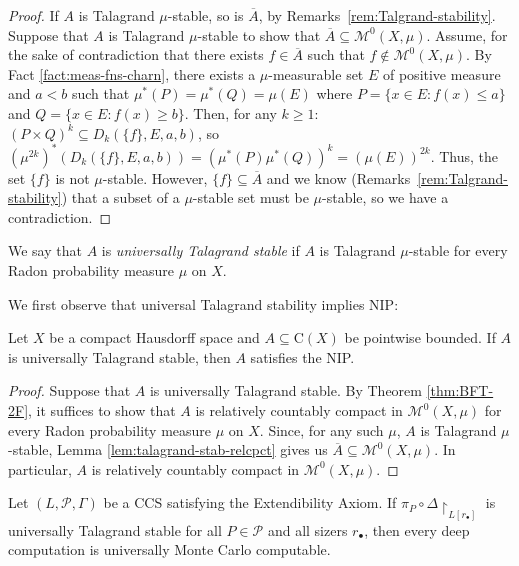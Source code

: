 \begin{proof}
    If $A$ is Talagrand $\mu$-stable, so is $\overline{A}$, by Remarks~\ref{rem:Talgrand-stability}.
    Suppose that $A$ is Talagrand $\mu$-stable to show that $\overline{A}\subseteq \mathscr{M}^0(X,\mu)$.
    Assume, for the sake of contradiction that there exists $f\in\overline{A}$ such that $f\notin \mathscr{M}^0(X,\mu)$.
    By Fact \ref{fact:meas-fns-charn}, there exists a $\mu$-measurable set $E$ of positive measure and $a<b$ such that $\mu^*(P)=\mu^*(Q)=\mu(E)$ where $P=\{x\in E: f(x)\leq a\}$ and $Q=\{x\in E: f(x)\geq b\}$.
    Then, for any $k\geq 1$: $(P\times Q)^k\subseteq D_k(\{f\},E,a,b)$, so $(\mu^{2k})^*(D_k(\{f\},E,a,b))=(\mu^*(P)\mu^*(Q))^k=(\mu(E))^{2k}$.
    Thus, the set $\{f\}$ is not $\mu$-stable. 
    However, $\{f\}\subseteq\overline{A}$ and we know (Remarks~\ref{rem:Talgrand-stability}) that a subset of a $\mu$-stable set must be $\mu$-stable,
    so we have a contradiction.
\end{proof}

\begin{definition}
We say that $A$ is \emph{universally Talagrand stable} if $A$ is Talagrand $\mu$-stable for every Radon probability measure $\mu$ on $X$.
\end{definition}

We first observe that universal Talagrand stability implies NIP:

\begin{proposition}\label{prop:Talagrand-implies-NIP}
    Let $X$ be a compact Hausdorff space and $A\subseteq \mathrm{C}(X)$ be pointwise bounded.
    If $A$ is universally Talagrand stable, then $A$ satisfies the NIP.
\end{proposition}

\begin{proof}
    Suppose that $A$ is universally Talagrand stable.
    By Theorem \ref{thm:BFT-2F}, it suffices to show that $A$ is relatively countably compact in $\mathscr{M}^0(X,\mu)$ for every Radon probability measure $\mu$ on $X$.
    Since, for any such $\mu$, $A$ is Talagrand $\mu$-stable, Lemma \ref{lem:talagrand-stab-relcpct} gives us $\overline{A}\subseteq\mathscr{M}^0(X,\mu)$.
    In particular, $A$ is relatively countably compact in $\mathscr{M}^0(X,\mu)$.
\end{proof}

\begin{corollary}
\label{cor:Talagrand-stab-Monte-Carlo}
    Let $(L,\mathcal{P},\Gamma)$ be a CCS satisfying the Extendibility Axiom.
If $\pi_P\circ\Delta\restriction_{L[r_\bullet]}$ is universally Talagrand stable for all $P\in\mathcal{P}$ and all sizers $r_{\bullet}$, then every deep computation is universally Monte Carlo computable.
\end{corollary}

